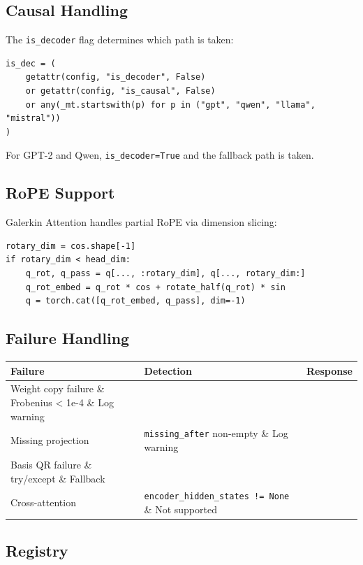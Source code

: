 \subsection{Causal Handling}

The \texttt{is\_decoder} flag determines which path is taken:

\begin{lstlisting}
is_dec = (
    getattr(config, "is_decoder", False)
    or getattr(config, "is_causal", False)
    or any(_mt.startswith(p) for p in ("gpt", "qwen", "llama", "mistral"))
)
\end{lstlisting}

For GPT-2 and Qwen, \texttt{is\_decoder=True} and the fallback path is taken.

\subsection{RoPE Support}

Galerkin Attention handles partial RoPE via dimension slicing:

\begin{lstlisting}
rotary_dim = cos.shape[-1]
if rotary_dim < head_dim:
    q_rot, q_pass = q[..., :rotary_dim], q[..., rotary_dim:]
    q_rot_embed = q_rot * cos + rotate_half(q_rot) * sin
    q = torch.cat([q_rot_embed, q_pass], dim=-1)
\end{lstlisting}

\subsection{Failure Handling}

\begin{table}[H]
\centering
\small
\begin{tabular}{lll}
\toprule
\textbf{Failure} & \textbf{Detection} & \textbf{Response} \\
\midrule
Weight copy failure \& Frobenius < 1e-4 \& Log warning \\
Missing projection & \texttt{missing\_after} non-empty \& Log warning \\
Basis QR failure \& try/except \& Fallback \\
Cross-attention & \texttt{encoder\_hidden\_states != None} \& Not supported \\
\bottomrule
\end{tabular}
\end{table}

\subsection{Registry}

